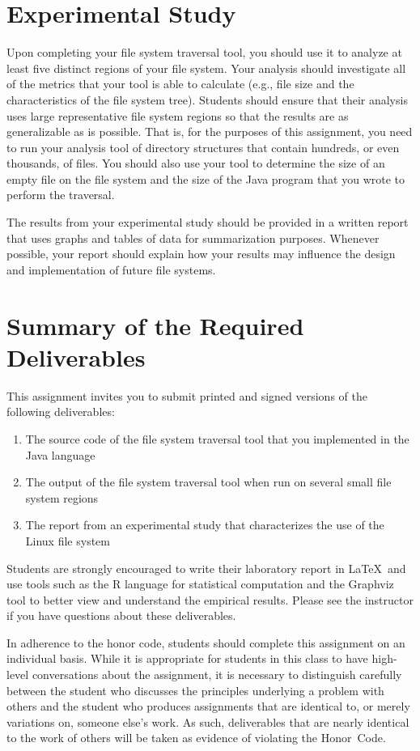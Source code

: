 \section*{Experimental Study}

Upon completing your file system traversal tool, you should use it to analyze at least five distinct regions of your file system.
Your analysis should investigate all of the metrics that your tool is able to calculate (e.g., file size and the characteristics
of the file system tree). Students should ensure that their analysis uses large representative file system regions so that the results
are as generalizable as is possible. That is, for the purposes of this assignment, you need to run your analysis tool of directory
structures that contain hundreds, or even thousands, of files. You should also use your tool to determine the size of an empty
file on the file system and the size of the Java program that you wrote to perform the traversal.

The results from your experimental study should be provided in a written report that uses graphs and tables of data for
summarization purposes. Whenever possible, your report should explain how your results may influence the design and implementation
of future file systems.

\section*{Summary of the Required Deliverables}

  This assignment invites you to submit printed and signed versions of the following deliverables: 

  \begin{enumerate}
    \item The source code of the file system traversal tool that you implemented in the Java language
    \item The output of the file system traversal tool when run on several small file system regions
    \item The report from an experimental study that characterizes the use of the Linux file system
  \end{enumerate}

  Students are strongly encouraged to write their laboratory report in \LaTeX~and use tools such as the R language for statistical
  computation and the Graphviz tool to better view and understand the empirical results. Please see the instructor if you have
  questions about these deliverables.

  In adherence to the honor code, students should complete this assignment on an individual basis. While it is appropriate for
  students in this class to have high-level conversations about the assignment, it is necessary to distinguish carefully between the
  student who discusses the principles underlying a problem with others and the student who produces assignments that are identical
  to, or merely variations on, someone else's work.  As such, deliverables that are nearly identical to the work of others will be
  taken as evidence of violating the \mbox{Honor Code}.  



  
